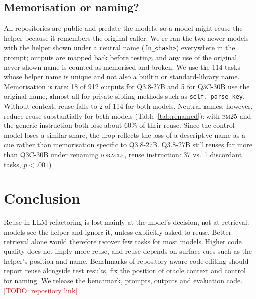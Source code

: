 \documentclass[11pt]{article}
\newcommand{\todo}[1]{\textcolor{red}{[TODO: #1]}}
\begin{document}
\subsection{Memorisation or naming?}
\label{sec:renaming}

\begin{table}[t]
\centering
\small
\setlength{\tabcolsep}{3pt}
\caption{Helper reused (of 114 tasks) with the original name $\to$ with a neutral name in the prompt
(McNemar $p$).}
\label{tab:renamed}
\end{table}

All repositories are public and predate the models, so a model might reuse the helper because it remembers
the original caller. We re-ran the two newer models with the helper shown under a neutral name
(\texttt{fn\_<hash>}) everywhere in the prompt; outputs are mapped back before testing, and any use of the
original, never-shown name is counted as memorised and broken. We use the 114 tasks whose helper name is
unique and not also a builtin or standard-library name.
Memorisation is rare: 18 of 912 outputs for Q3.8-27B and 5 for Q3C-30B use the original name, almost all
for private sibling methods such as \texttt{self.\_parse\_key}. Without context, reuse falls to 2 of 114
for both models. Neutral names, however, reduce reuse substantially for both models (Table~\ref{tab:renamed}):
with \textsc{bm25} and the generic instruction both lose about 60\% of their reuse. Since the control model
loses a similar share, the drop reflects the loss of a descriptive name as a cue rather than memorisation
specific to Q3.8-27B. Q3.8-27B still reuses far more than Q3C-30B under renaming
(\textsc{oracle}, reuse instruction: 37 vs.\ 1 discordant tasks, $p<.001$).

\section{Conclusion}

Reuse in LLM refactoring is lost mainly at the model's decision, not at retrieval: models see the helper and
ignore it, unless explicitly asked to reuse. Better retrieval alone would therefore recover few tasks for most
models. Higher code quality does not imply more reuse, and reuse depends on surface cues such as the helper's
position and name. Benchmarks of repository-aware code editing should report reuse alongside test results,
fix the position of oracle context and control for naming. We release the benchmark, prompts, outputs and
evaluation code.\todo{repository link}
\end{document}
